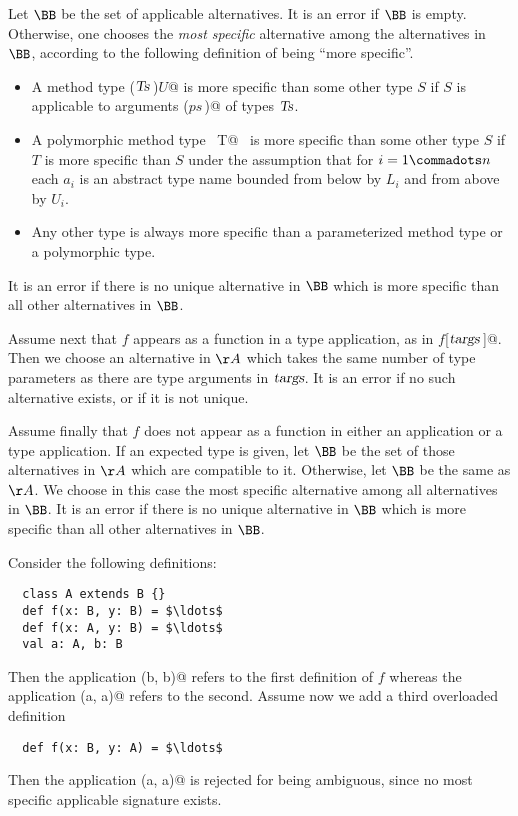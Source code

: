 \documentclass[a4paper,12pt,twoside,titlepage]{book}
\newcommand{\targs}{\mbox{\sl targs}}
\newcommand{\Ts}{\mbox{\sl Ts}}
\begin{document}
Let $\BB$ be the set of applicable alternatives. It is an error if
$\BB$ is empty. Otherwise, one chooses the {\em most specific}
alternative among the alternatives in $\BB$, according to the
following definition of being ``more specific''.
\begin{itemize} 
\item
A method type \lstinline@($\Ts\,$)$U$@ is more specific than some other
type $S$ if $S$ is applicable to arguments \lstinline@($ps\,$)@ of
types $\Ts$.
\item
A polymorphic method type
~\lstinline@[$a_1$ >: $L_1$ <: $U_1 \commadots a_n$ >: $L_n$ <: $U_n$]T@~ is
more specific than some other type $S$ if $T$ is more
specific than $S$ under the assumption that for
$i = 1 \commadots n$ each $a_i$ is an abstract type name
bounded from below by $L_i$ and from above by $U_i$.
\item
Any other type is always more specific than a parameterized method
type or a polymorphic type.
\end{itemize}
It is an error if there is no unique alternative in $\BB$ which is
more specific than all other alternatives in $\BB$.

Assume next that $f$ appears as a function in a type
application, as in \lstinline@$f$[$\targs\,$]@. Then we choose an alternative in
$\AA$ which takes the same number of type parameters as there are
type arguments in $\targs$. It is an error if no such alternative
exists, or if it is not unique.

Assume finally that $f$ does not appear as a function in either
an application or a type application. If an expected type is given,
let $\BB$ be the set of those alternatives in $\AA$ which are
compatible to it. Otherwise, let $\BB$ be the same as $\AA$.
We choose in this case the most specific alternative among all
alternatives in $\BB$. It is an error if there is no unique
alternative in $\BB$ which is more specific than all other
alternatives in $\BB$.

\example Consider the following definitions:

\begin{lstlisting}
  class A extends B {}
  def f(x: B, y: B) = $\ldots$
  def f(x: A, y: B) = $\ldots$
  val a: A, b: B
\end{lstlisting}
Then the application \lstinline@f(b, b)@ refers to the first
definition of $f$ whereas the application \lstinline@f(a, a)@
refers to the second.  Assume now we add a third overloaded definition
\begin{lstlisting}
  def f(x: B, y: A) = $\ldots$
\end{lstlisting}
Then the application \lstinline@f(a, a)@ is rejected for being ambiguous, since
no most specific applicable signature exists.
\end{document}
